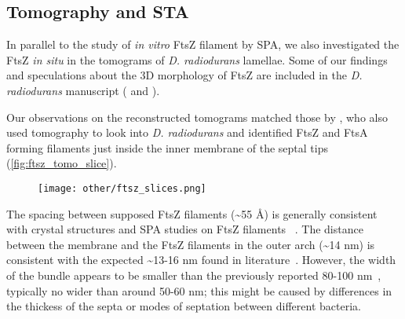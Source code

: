 \subsection{Tomography and STA}

In parallel to the study of \textit{in vitro} FtsZ filament by SPA, we also investigated the FtsZ \textit{in situ} in the tomograms of \textit{D. radiodurans} lamellae.
Some of our findings and speculations about the 3D morphology of FtsZ are included in the \textit{D. radiodurans} manuscript ( and ).

Our observations on the reconstructed tomograms matched those by \citet{sextonSuperresolutionConfocalCryoCLEM2022}, who also used tomography to look into \textit{D. radiodurans} and identified FtsZ and FtsA forming filaments just inside the inner membrane of the septal tips (\autoref{fig:ftsz_tomo_slice}). %

\begin{figure}
    \centering
    \texttt{[image: other/ftsz\_slices.png]}
    \label{fig:ftsz_tomo_slice}
\end{figure}

The spacing between supposed FtsZ filaments (\sim55 Å) is generally consistent with crystal structures and SPA studies on FtsZ filaments ~\cite{mcquillenInsightsStructureFunction2020}.
The distance between the membrane and the FtsZ filaments in the outer arch (\sim14 nm) is consistent with the expected \sim13-16 nm found in literature~\cite{mcquillenInsightsStructureFunction2020}.
However, the width of the bundle appears to be smaller than the previously reported 80-100 nm~\cite{mcquillenInsightsStructureFunction2020}, typically no wider than around 50-60 nm; this might be caused by differences in the thickess of the septa or modes of septation between different bacteria.

